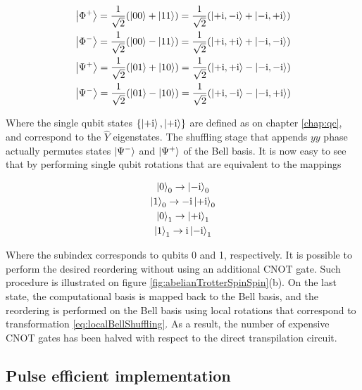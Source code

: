     \begin{gather}
      \ket{\Phi^{+}} = \frac{1}{\sqrt{2}}(\ket{00} + \ket{11}) = \frac{1}{\sqrt{2}}(\ket{+\mathrm{i},-\mathrm{i}} + \ket{-\mathrm{i},+\mathrm{i}}) \\
      \ket{\Phi^{-}} = \frac{1}{\sqrt{2}}(\ket{00} - \ket{11}) = \frac{1}{\sqrt{2}}(\ket{+\mathrm{i},+\mathrm{i}} + \ket{-\mathrm{i},-\mathrm{i}}) \\
      \ket{\Psi^{+}} = \frac{1}{\sqrt{2}}(\ket{01} + \ket{10}) = \frac{1}{\sqrt{2}}(\ket{+\mathrm{i},+\mathrm{i}} - \ket{-\mathrm{i},-\mathrm{i}}) \\
      \ket{\Psi^{-}} = \frac{1}{\sqrt{2}}(\ket{01} - \ket{10}) = \frac{1}{\sqrt{2}}(\ket{+\mathrm{i},-\mathrm{i}} - \ket{-\mathrm{i},+\mathrm{i}}) 
      \label{eq:bellOnYBasis}
    \end{gather}

    Where the single qubit states $\{\ket{+\mathrm{i}}, \ket{+\mathrm{i}}\}$ are defined as on chapter \ref{chap:qc}, and correspond to the $\hat{Y}$ eigenstates. The shuffling stage that appends $yy$ phase actually permutes states $\ket{\Psi^{-}}$ and $\ket{\Psi^{+}}$ of the Bell basis. It is now easy to see that by performing single qubit rotations that are equivalent to the mappings

    \begin{gather}
      \ket{0}_0 \rightarrow \ket{-\mathrm{i}}_0 \\
      \ket{1}_0 \rightarrow -\mathrm{i}\ket{+\mathrm{i}}_0 \\
      \ket{0}_1 \rightarrow \ket{+\mathrm{i}}_1 \\
      \ket{1}_1 \rightarrow \mathrm{i}\ket{-\mathrm{i}}_1 \\
      \label{eq:localBellShuffling}
    \end{gather}

    Where the subindex corresponds to qubits 0 and 1, respectively. It is possible to perform the desired reordering without using an additional CNOT gate. Such procedure is illustrated on figure \ref{fig:abelianTrotterSpinSpin}(b). On the last state, the computational basis is mapped back to the Bell basis, and the reordering is performed on the Bell basis using local rotations that correspond to transformation \ref{eq:localBellShuffling}. As a result, the number of expensive CNOT gates has been halved with respect to the direct transpilation circuit.

    

  \subsection{Pulse efficient implementation}
  \label{subsec:PulseEfficientCircuit}

